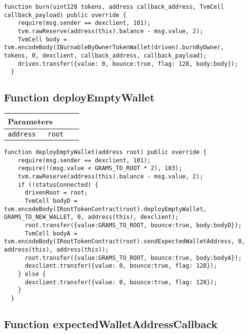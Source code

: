 \vspace{2cm}

\begin{lstlisting}[firstnumber=116]
  function burn(uint128 tokens, address callback_address, TvmCell callback_payload) public override {
    require(msg.sender == dexclient, 101);
    tvm.rawReserve(address(this).balance - msg.value, 2);
    TvmCell body = tvm.encodeBody(IBurnableByOwnerTokenWallet(driven).burnByOwner, tokens, 0, dexclient, callback_address, callback_payload);
    driven.transfer({value: 0, bounce:true, flag: 128, body:body});
  }
\end{lstlisting}

\subsection{Function deployEmptyWallet}


\ifsoltables
\noindent\begin{tabular}{|l|l|p{5cm}|}\hline
\multicolumn{3}{|l|}{\bf Parameters}\\\hline
\tt address & \tt root &\\\hline
\end{tabular}
\fi

\vspace{2cm}

\begin{lstlisting}[firstnumber=60]
  function deployEmptyWallet(address root) public override {
    require(msg.sender == dexclient, 101);
    require(!(msg.value < GRAMS_TO_ROOT * 2), 103);
    tvm.rawReserve(address(this).balance - msg.value, 2);
    if (!statusConnected) {
      drivenRoot = root;
      TvmCell bodyD = tvm.encodeBody(IRootTokenContract(root).deployEmptyWallet, GRAMS_TO_NEW_WALLET, 0, address(this), dexclient);
      root.transfer({value:GRAMS_TO_ROOT, bounce:true, body:bodyD});
      TvmCell bodyA = tvm.encodeBody(IRootTokenContract(root).sendExpectedWalletAddress, 0, address(this), address(this));
      root.transfer({value:GRAMS_TO_ROOT, bounce:true, body:bodyA});
      dexclient.transfer({value: 0, bounce:true, flag: 128});
    } else {
      dexclient.transfer({value: 0, bounce:true, flag: 128});
    }
  }
\end{lstlisting}

\subsection{Function expectedWalletAddressCallback}



